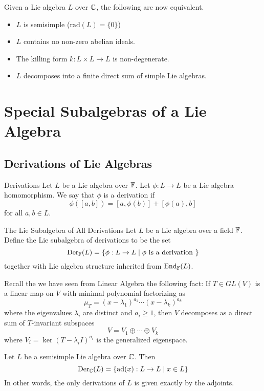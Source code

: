 \documentclass[a4paper]{article}
\begin{document}
Given a Lie algebra $L$ over $\mathbb{C}$, the following are now equivalent. 
\begin{itemize}
\item $L$ is semisimple ($\text{rad}(L)=\{0\}$)
\item $L$ contains no non-zero abelian ideals. 
\item The killing form $k:L\times L\to L$ is non-degenerate. 
\item $L$ decomposes into a finite direct sum of simple Lie algebras. 
\end{itemize}


\pagebreak
\section{Special Subalgebras of a Lie Algebra}
\subsection{Derivations of Lie Algebras}
\begin{defn}{Derivations}{} Let $L$ be a Lie algebra over $\mathbb{F}$. Let $\phi:L\to L$ be a Lie algebra homomorphism. We say that $\phi$ is a derivation if $$\phi([a,b])=[a,\phi(b)]+[\phi(a),b]$$ for all $a,b\in L$. 
\end{defn}

\begin{defn}{The Lie Subalgebra of All Derivations}{} Let $L$ be a Lie algebra over a field $\mathbb{F}$. Define the Lie subalgebra of derivations to be the set $$\text{Der}_{\mathbb{F}}(L)=\{\phi:L\to L\;|\;\phi\text{ is a derivation }\}$$ together with Lie algebra structure inherited from $\text{End}_{\mathbb{F}}(L)$. 
\end{defn}

Recall the we have seen from Linear Algebra the following fact: If $T\in GL(V)$ is a linear map on $V$ with minimal polynomial factorizing as $$\mu_T=(x-\lambda_1)^{a_1}\cdots(x-\lambda_k)^{a_k}$$ where the eigenvalues $\lambda_i$ are distinct and $a_i\geq 1$, then $V$ decomposes as a direct sum of $T$-invariant subspaces $$V=V_1\oplus\cdots\oplus V_k$$ where $V_i=\ker(T-\lambda_i I)^{a_i}$ is the generalized eigenspace. 

\begin{prp}{}{} Let $L$ be a semisimple Lie algebra over $\mathbb{C}$. Then $$\text{Der}_{\mathbb{C}}(L)=\{\text{ad}(x):L\to L\;|\;x\in L\}$$ In other words, the only derivations of $L$ is given exactly by the adjoints. 
\end{prp}
\end{document}
